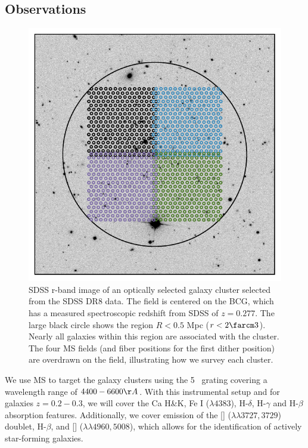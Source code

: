 \subsection{Observations} 
\begin{figure}
	\includegraphics[width=\textwidth]{./figures2/pointing.pdf} 
	\caption{SDSS r-band image of an optically selected galaxy cluster selected from the SDSS DR8 data. The field is centered on the BCG, which has a measured spectroscopic redshift from SDSS of $z = 0.277$. The large black circle shows the region $R<0.5$ Mpc ($r<2\farcm3$). Nearly all galaxies within this region are associated with the cluster. The four MS fields (and fiber positions for the first dither position) are overdrawn on the field, illustrating how we survey each cluster.} \label{fig:tiles} 
\end{figure}

We use MS to target the galaxy clusters using the 5 \AAA\ grating covering a wavelength range of $4400 - 6600\AA$. With this instrumental setup and for galaxies $z = 0.2-0.3$, we will cover the Ca H\&K, Fe I ($\lambda 4383$), H-$\delta$, H-$\gamma$ and H-$\beta$ absorption features. Additionally, we cover emission of the \hbox{[]} ($\lambda\lambda 3727,3729$) doublet, H-$\beta$, and \hbox{[]} ($\lambda\lambda 4960,5008$), which allows for the identification of actively star-forming galaxies.

